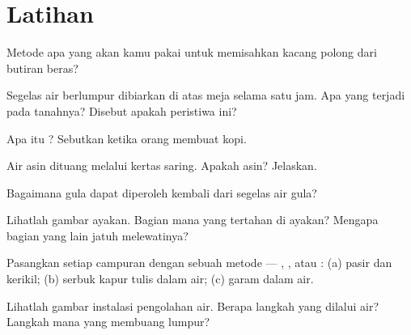 \section{Latihan}

\begin{exercise}[$\star$]\label{exo:g3:separating-mixtures:1}
Metode apa yang akan kamu pakai untuk memisahkan kacang polong dari
butiran beras?
\end{exercise}

\begin{exercise}[$\star$]\label{exo:g3:separating-mixtures:2}
Segelas air berlumpur dibiarkan di atas meja selama satu jam. Apa yang
terjadi pada tanahnya? Disebut apakah peristiwa ini?
\end{exercise}

\begin{exercise}[$\star$]\label{exo:g3:separating-mixtures:3}
Apa itu ? Sebutkan  ketika orang membuat kopi.
\end{exercise}

\begin{exercise}[$\star$]\label{exo:g3:separating-mixtures:4}
Air asin dituang melalui kertas saring. Apakah  asin?
Jelaskan.
\end{exercise}

\begin{exercise}[$\star$]\label{exo:g3:separating-mixtures:5}
Bagaimana gula dapat diperoleh kembali dari segelas air gula?
\end{exercise}

\begin{exercise}[$\star$]\label{exo:g3:separating-mixtures:6}
Lihatlah gambar ayakan. Bagian mana yang tertahan di ayakan? Mengapa
bagian yang lain jatuh melewatinya?
\end{exercise}

\begin{exercise}[$\star$]\label{exo:g3:separating-mixtures:7}
Pasangkan setiap campuran dengan sebuah metode --- ,
, atau : (a) pasir dan kerikil; (b) serbuk kapur
tulis dalam air; (c) garam dalam air.
\end{exercise}

\begin{exercise}[$\star$]\label{exo:g3:separating-mixtures:8}
Lihatlah gambar instalasi pengolahan air. Berapa langkah yang dilalui
air? Langkah mana yang membuang lumpur?
\end{exercise}

